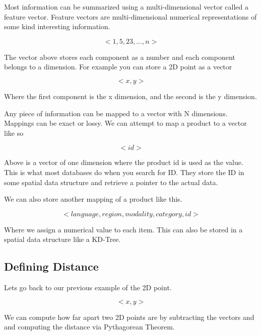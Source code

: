 \documentclass[11pt]{article}
\begin{document}
Most information can be summarized using a multi-dimensional vector called a feature vector. 
Feature vectors are multi-dimensional numerical representations of some kind interesting information. 

\begin{equation}
    < 1, 5, 23, ..., n > 
\end{equation}

The vector above stores each component as a number and each component belongs to a dimension.
For example you can store a 2D point as a vector

\begin{equation}
    < x, y > 
\end{equation}

Where the first component is the x dimension, and the second is the y dimension.

Any piece of information can be mapped to a vector with N dimensions. Mappings 
can be exact or lossy. We can attempt to map a product to a vector like so

\begin{equation}
    < id > 
\end{equation}

Above is a vector of one dimension where the product id is used as the value. 
This is what most databases do when you search for ID. They store the ID in some
spatial data structure and retrieve a pointer to the actual data.

We can also store another mapping of a product like this.

\begin{equation}
    < language, region, modality, category, id> 
\end{equation}

Where we assign a numerical value to each item. This can also be stored in a spatial
data structure like a KD-Tree. 

\subsection{Defining Distance}

Lets go back to our previous example of the 2D point.

\begin{equation}
    < x, y > 
\end{equation}

We can compute how far apart two 2D points are by subtracting the vectors and 
and computing the distance via Pythagorean Theorem.
\end{document}
